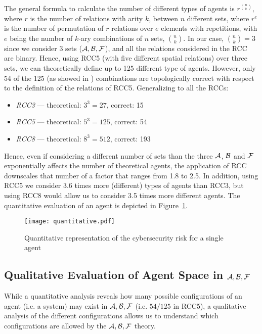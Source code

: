 The general formula to calculate the number of different types of agents is
$r^{\binom{n}{k}}$, where $r$ is the number of relations with arity $k$,
between $n$ different sets, where $r^e$ is the number of permutation of $r$
relations over $e$ elements with repetitions, with $e$ being the number of
$k$-ary combinations of $n$ sets, $\binom{n}{k}$.
In our case, $\binom{n}{k}=3$ since we consider $3$ sets
($\mathcal{A},\mathcal{B},\mathcal{F}$), and all the relations
considered in the RCC are binary.  Hence, using RCC5 (with five different
spatial relations) over three sets, we can theoretically define up to 125
different type of agents. However, only 54 of the 125 (as showed in
\cite{improvingRCC}) combinations are topologically correct with respect to
the definition of the relations of RCC5. Generalizing to all the RCCs:

\begin{itemize}%
\item \emph{RCC3} --- theoretical: $3^3=27$,  correct: 15 
\item \emph{RCC5} --- theoretical: $5^3=125$, correct: 54
\item \emph{RCC8} --- theoretical: $8^3=512$, correct: 193
\end{itemize}

Hence, even if considering a different number of sets than the three
$\mathcal{A}$, $\mathcal{B}$ and $\mathcal{F}$ exponentially affects
the number of theoretical agents, the application of RCC downscales that number
of a factor that ranges from 1.8 to 2.5. In addition, using RCC5 we consider
3.6 times more (different) types of agents than RCC3, but using RCC8 would
allow us to consider 3.5 times more different agents.
The quantitative evaluation of an agent is depicted in Figure~\ref{fig:quantitative}.

\begin{figure}[t]
	\centering
	\texttt{[image: quantitative.pdf]}
	\caption{Quantitative representation of the cybersecurity risk for a single agent}
	\label{fig:quantitative}
\end{figure}

\subsection{Qualitative Evaluation of Agent Space in $\mathcal{A},\mathcal{B},\mathcal{F}$}\label{sec:agentspace}
While a quantitative analysis reveals how many possible configurations
of an agent (i.e. a system) may exist in $\mathcal{A},\mathcal{B},\mathcal{F}$ (i.e. $54/125$ in RCC5), a qualitative
analysis of the different configurations allows us to understand 
which configurations are allowed by the $\mathcal{A},\mathcal{B},\mathcal{F}$ theory.

